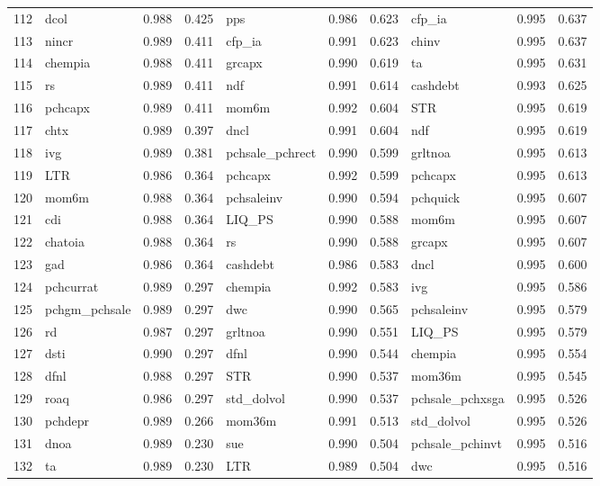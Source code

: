 \begin{landscape}
\begin{footnotesize}
\begin{longtable}{l|lcc|lcc|lcc}
  112 & dcol & 0.988 & 0.425 & pps & 0.986 & 0.623 & cfp\_ia & 0.995 & 0.637 \\ 
  113 & nincr & 0.989 & 0.411 & cfp\_ia & 0.991 & 0.623 & chinv & 0.995 & 0.637 \\ 
  114 & chempia & 0.988 & 0.411 & grcapx & 0.990 & 0.619 & ta & 0.995 & 0.631 \\ 
  115 & rs & 0.989 & 0.411 & ndf & 0.991 & 0.614 & cashdebt & 0.993 & 0.625 \\ 
  116 & pchcapx & 0.989 & 0.411 & mom6m & 0.992 & 0.604 & STR & 0.995 & 0.619 \\ 
  117 & chtx & 0.989 & 0.397 & dncl & 0.991 & 0.604 & ndf & 0.995 & 0.619 \\ 
  118 & ivg & 0.989 & 0.381 & pchsale\_pchrect & 0.990 & 0.599 & grltnoa & 0.995 & 0.613 \\ 
  119 & LTR & 0.986 & 0.364 & pchcapx & 0.992 & 0.599 & pchcapx & 0.995 & 0.613 \\ 
  120 & mom6m & 0.988 & 0.364 & pchsaleinv & 0.990 & 0.594 & pchquick & 0.995 & 0.607 \\ 
  121 & cdi & 0.988 & 0.364 & LIQ\_PS & 0.990 & 0.588 & mom6m & 0.995 & 0.607 \\ 
  122 & chatoia & 0.988 & 0.364 & rs & 0.990 & 0.588 & grcapx & 0.995 & 0.607 \\ 
  123 & gad & 0.986 & 0.364 & cashdebt & 0.986 & 0.583 & dncl & 0.995 & 0.600 \\ 
  124 & pchcurrat & 0.989 & 0.297 & chempia & 0.992 & 0.583 & ivg & 0.995 & 0.586 \\ 
  125 & pchgm\_pchsale & 0.989 & 0.297 & dwc & 0.990 & 0.565 & pchsaleinv & 0.995 & 0.579 \\ 
  126 & rd & 0.987 & 0.297 & grltnoa & 0.990 & 0.551 & LIQ\_PS & 0.995 & 0.579 \\ 
  127 & dsti & 0.990 & 0.297 & dfnl & 0.990 & 0.544 & chempia & 0.995 & 0.554 \\ 
  128 & dfnl & 0.988 & 0.297 & STR & 0.990 & 0.537 & mom36m & 0.995 & 0.545 \\ 
  129 & roaq & 0.986 & 0.297 & std\_dolvol & 0.990 & 0.537 & pchsale\_pchxsga & 0.995 & 0.526 \\ 
  130 & pchdepr & 0.989 & 0.266 & mom36m & 0.991 & 0.513 & std\_dolvol & 0.995 & 0.526 \\ 
  131 & dnoa & 0.989 & 0.230 & sue & 0.990 & 0.504 & pchsale\_pchinvt & 0.995 & 0.516 \\ 
  132 & ta & 0.989 & 0.230 & LTR & 0.989 & 0.504 & dwc & 0.995 & 0.516 \\ 

\end{longtable}
\end{footnotesize}
\end{landscape}
